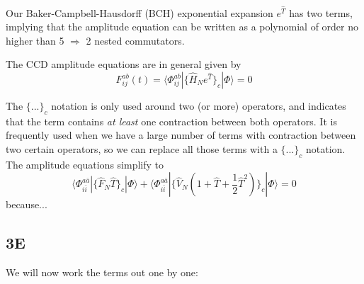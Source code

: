 \documentclass[norsk,a4paper,12pt]{article}
\begin{document}
Our Baker-Campbell-Hausdorff (BCH) exponential expansion $e^{\hat{T}}$ has two terms, implying that the amplitude equation can be written as a polynomial of order no higher than 5 $\Rightarrow$ 2 nested commutators. 

The CCD amplitude equations are in general given by
\begin{equation}
F_{ij}^{ab}(t)=\langle\Phi_{ij}^{ab}|\{\hat{H}_Ne^{\hat{T}}\}_c|\Phi\rangle=0
\end{equation}

The $\{...\}_c$ notation is only used around two (or more) operators, and indicates that the term contains \textit{at least} one contraction between both operators. It is frequently used when we have a large number of terms with contraction between two certain operators, so we can replace all those terms with a $\{...\}_c$ notation. The amplitude equations simplify to
\begin{equation}
\langle\Phi_{i\bar{i}}^{a\bar{a}}|\{\hat{F}_N\hat{T}\}_c|\Phi\rangle+\langle\Phi_{i\bar{i}}^{a\bar{a}}|\{\hat{V}_N(1+\hat{T}+\frac{1}{2}\hat{T}^2)\}_c|\Phi\rangle=0
\end{equation}
because...


\subsection*{3E}
We will now work the terms out one by one:
\end{document}
